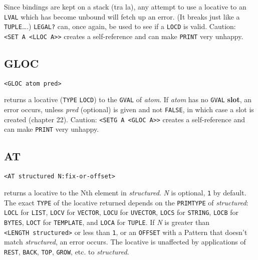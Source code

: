 \documentclass[a4paper]{scrbook}
\begin{document}
Since bindings are kept on a stack (tra la), any attempt to use a locative to an \texttt{LVAL} which has become unbound
will fetch up an error. (It breaks just like a \texttt{TUPLE}\ldots{}.) \texttt{LEGAL?}  can, once
again, be used to see if a \texttt{LOCD} is valid. Caution:
\texttt{\textless{}SET\ A\ \textless{}LLOC\ A\textgreater{}\textgreater{}} creates a self-reference and can make
\texttt{PRINT} very unhappy.

\subsection{GLOC}\label{gloc}

\begin{verbatim}
<GLOC atom pred>
\end{verbatim}

 returns a locative (\texttt{TYPE} \texttt{LOCD}) to the \texttt{GVAL} of
\emph{atom}. If \emph{atom} has no \texttt{GVAL}  \textbf{slot}, an error occurs, unless \emph{pred}
(optional) is given and not \texttt{FALSE}, in which case a slot is created (chapter 22). Caution:
\texttt{\textless{}SETG\ A\ \textless{}GLOC\ A\textgreater{}\textgreater{}} creates a self-reference and can make
\texttt{PRINT} very unhappy.

\subsection{AT}\label{at}

\begin{verbatim}
<AT structured N:fix-or-offset>
\end{verbatim}

 returns a locative to the Nth element in \emph{structured}. \emph{N} is optional, \texttt{1} by
default. The exact \texttt{TYPE} of the locative returned depends on the \texttt{PRIMTYPE} of \emph{structured}:
\texttt{LOCL}  for \texttt{LIST}, \texttt{LOCV}  for
\texttt{VECTOR}, \texttt{LOCU}  for \texttt{UVECTOR}, \texttt{LOCS}
 for \texttt{STRING}, \texttt{LOCB}  for \texttt{BYTES},
\texttt{LOCT}  for \texttt{TEMPLATE}, and \texttt{LOCA}  for
\texttt{TUPLE}. If \emph{N} is greater than \texttt{\textless{}LENGTH\ structured\textgreater{}} or less than \texttt{1},
or an \texttt{OFFSET} with a Pattern that doesn't match \emph{structured}, an error occurs. The locative is unaffected by
applications of \texttt{REST}, \texttt{BACK}, \texttt{TOP}, \texttt{GROW}, etc. to \emph{structured}.
\end{document}
